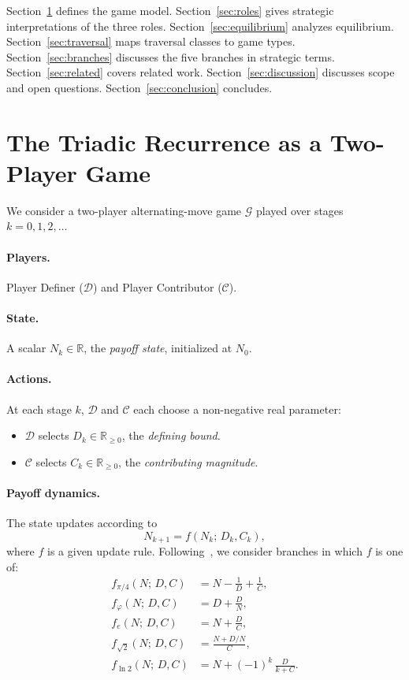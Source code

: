 \documentclass[12pt]{article}
\theoremstyle{definition}
\theoremstyle{remark}
\begin{document}
Section~\ref{sec:game} defines the game model.
Section~\ref{sec:roles} gives strategic interpretations of the three roles.
Section~\ref{sec:equilibrium} analyzes equilibrium.
Section~\ref{sec:traversal} maps traversal classes to game types.
Section~\ref{sec:branches} discusses the five branches in strategic terms.
Section~\ref{sec:related} covers related work.
Section~\ref{sec:discussion} discusses scope and open questions.
Section~\ref{sec:conclusion} concludes.

\section{The Triadic Recurrence as a Two-Player Game}
\label{sec:game}

We consider a two-player alternating-move game $\mathcal{G}$ played over stages
$k = 0, 1, 2, \ldots$

\paragraph{Players.}
Player Definer ($\mathcal{D}$) and Player Contributor ($\mathcal{C}$).

\paragraph{State.}
A scalar $N_k \in \mathbb{R}$, the \emph{payoff state}, initialized at $N_0$.

\paragraph{Actions.}
At each stage $k$, $\mathcal{D}$ and $\mathcal{C}$ each choose a non-negative real
parameter:
\begin{itemize}
\item $\mathcal{D}$ selects $D_k \in \mathbb{R}_{\geq 0}$, the \emph{defining bound}.
\item $\mathcal{C}$ selects $C_k \in \mathbb{R}_{\geq 0}$, the \emph{contributing
      magnitude}.
\end{itemize}

\paragraph{Payoff dynamics.}
The state updates according to
\[
  N_{k+1} = f(N_k;\, D_k, C_k),
\]
where $f$ is a given update rule.  Following~\cite{Mil26a}, we consider branches in
which $f$ is one of:
\begin{align}
  f_{\pi/4}(N;\, D, C) &= N - \tfrac{1}{D} + \tfrac{1}{C}, \label{eq:fpi}\\
  f_{\varphi}(N;\, D, C) &= D + \tfrac{D}{N}, \label{eq:fphi}\\
  f_{e}(N;\, D, C) &= N + \tfrac{D}{C}, \label{eq:fe}\\
  f_{\sqrt{2}}(N;\, D, C) &= \tfrac{N + D/N}{C}, \label{eq:fsqrt2}\\
  f_{\ln 2}(N;\, D, C) &= N + (-1)^k\, \tfrac{D}{k + C}. \label{eq:fln2}
\end{align}
\end{document}
